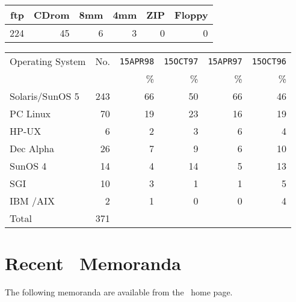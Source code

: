 \begin{center}
\begin{tabular}{|r|r|r|r|r|r|} \hline\hline
{ftp} & {CDrom} &{8mm} & {4mm} & {ZIP} & {Floppy} \\ \hline
224   &      45 &   6  &    3  &    0  &       0  \\ \hline\hline
\end{tabular}
\end{center}

\begin{center}
\begin{tabular}{|l|r|r|r|r|r|} \hline\hline
{Operating System} & {No.} & \texttt{15APR98}  & \texttt{15OCT97}  &
                             \texttt{15APR97}  & \texttt{15OCT96}  \\
                &       & {\%}  & {\%}   & {\%}   &  {\%}  \\ \hline
Solaris/SunOS 5 &    243   & 66 & 50 & 66 & 46  \\
PC Linux        &     70   & 19 & 23 & 16 & 19  \\
HP-UX           &      6   &  2 &  3 &  6 &  4  \\
Dec Alpha       &     26   &  7 &  9 &  6 & 10  \\
SunOS 4         &     14   &  4 & 14 &  5 & 13  \\
SGI             &     10   &  3 &  1 &  1 &  5  \\
IBM /AIX        &      2   &  1 &  0 &  0 &  4  \\
Total           &    371   &    &    &    &   \\ \hline\hline
\end{tabular}
\end{center}


\section{Recent \AIPS\ Memoranda}

The following memoranda are available from the \AIPS\ home page.

